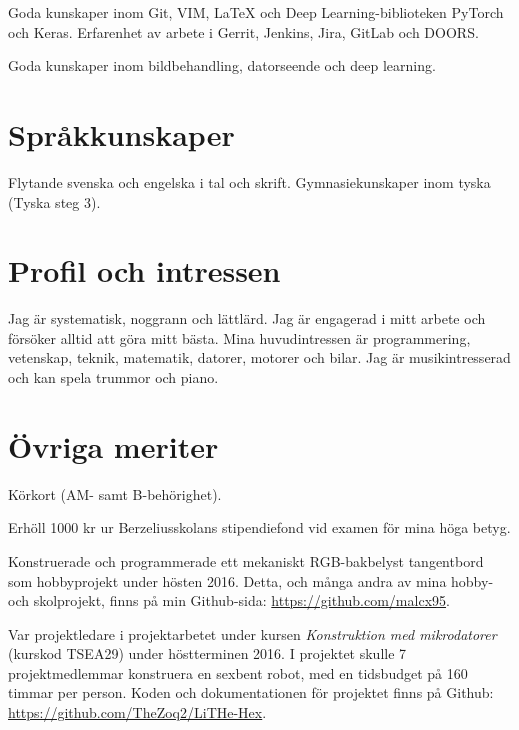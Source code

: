 \documentclass[a4paper,notitlepage]{article}
\begin{document}
Goda kunskaper inom Git, VIM, LaTeX och Deep Learning-biblioteken PyTorch och
Keras. Erfarenhet av arbete i Gerrit, Jenkins, Jira, GitLab och DOORS.

Goda kunskaper inom bildbehandling, datorseende och deep learning.

\section*{Språkkunskaper}
Flytande svenska och engelska i tal och skrift. Gymnasiekunskaper inom tyska
(Tyska steg 3).

\section*{Profil och intressen}
Jag är systematisk, noggrann och lättlärd. Jag är engagerad i mitt arbete och
försöker alltid att göra mitt bästa. Mina huvudintressen är programmering, vetenskap,
teknik, matematik, datorer, motorer och bilar. Jag är musikintresserad och kan
spela trummor och piano.

\section*{Övriga meriter}
Körkort (AM- samt B-behörighet).

Erhöll 1000 kr ur Berzeliusskolans stipendiefond vid examen för mina höga
betyg.

Konstruerade och programmerade ett mekaniskt RGB-bakbelyst tangentbord som
hobbyprojekt under hösten 2016. Detta, och många andra av mina hobby- och skolprojekt, finns på min Github-sida: \url{https://github.com/malcx95}.

Var projektledare i projektarbetet under kursen \textit{Konstruktion med
mikrodatorer} (kurskod TSEA29) under höstterminen 2016.
I projektet skulle 7 projektmedlemmar
konstruera en sexbent robot, med en tidsbudget på 160 timmar per person. Koden
och dokumentationen för projektet finns på Github:
\url{https://github.com/TheZoq2/LiTHe-Hex}.
\end{document}
